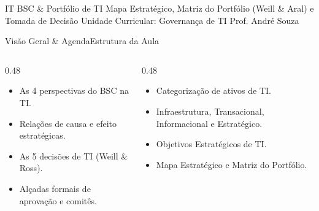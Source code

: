
\senaicover
  {IT BSC \& Portfólio de TI}
  {Mapa Estratégico, Matriz do Portfólio (Weill \& Aral) e Tomada de Decisão}
  {Unidade Curricular: Governança de TI}
  {Prof. André Souza}

\begin{senaiframe}{Visão Geral \& Agenda}{Estrutura da Aula}
  \begin{columns}[t]
    \begin{column}{0.48\textwidth}
      \begin{tcolorbox}[senaibluecard, title={1. IT Balanced Scorecard}]
        \begin{itemize}
          \item As 4 perspectivas do BSC na TI.
          \item Relações de causa e efeito estratégicas.
        \end{itemize}
      \end{tcolorbox}
      \vspace{4pt}
      \begin{tcolorbox}[senaiambercard, title={3. Mecanismos de Decisão}]
        \begin{itemize}
          \item As 5 decisões de TI (Weill \& Ross).
          \item Alçadas formais de aprovação e comitês.
        \end{itemize}
      \end{tcolorbox}
    \end{column}
    \begin{column}{0.48\textwidth}
      \begin{tcolorbox}[senairedcard, title={2. Portfólio de TI}]
        \begin{itemize}
          \item Categorização de ativos de TI.
          \item Infraestrutura, Transacional, Informacional e Estratégico.
        \end{itemize}
      \end{tcolorbox}
      \vspace{4pt}
      \begin{tcolorbox}[senaigreencard, title={4. Capítulo 3 do PDGTI}]
        \begin{itemize}
          \item Objetivos Estratégicos de TI.
          \item Mapa Estratégico e Matriz do Portfólio.
        \end{itemize}
      \end{tcolorbox}
    \end{column}
  \end{columns}
\end{senaiframe}

